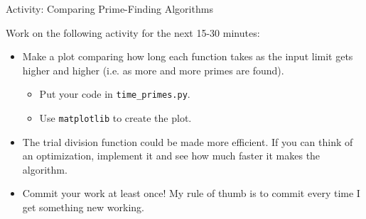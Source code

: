 \begin{frame}{Activity: Comparing Prime-Finding Algorithms}

 Work on the following activity for the next 15-30 minutes:

 \begin{itemize}

  \item Make a plot comparing how long each function takes as the input limit 
   gets higher and higher (i.e. as more and more primes are found).

  \begin{itemize}

   \item Put your code in \texttt{time\_primes.py}.

   \item Use \texttt{matplotlib} to create the plot.

  \end{itemize}

  \item The trial division function could be made more efficient.  If you can 
   think of an optimization, implement it and see how much faster it makes the 
   algorithm.

  \item Commit your work at least once!  My rule of thumb is to commit every 
   time I get something new working.

 \end{itemize}

\end{frame}

